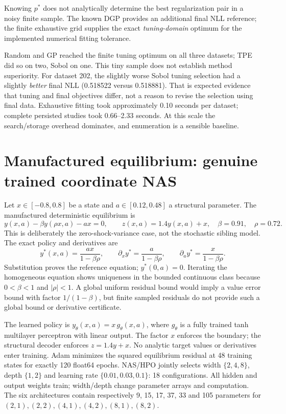 Knowing $p^*$ does not analytically determine the best regularization pair in
a noisy finite sample. The known DGP provides an additional final NLL reference;
the finite exhaustive grid supplies the exact \emph{tuning-domain} optimum for
the implemented numerical fitting tolerance.



Random and GP reached the finite tuning optimum on all three datasets; TPE did
so on two, Sobol on one. This tiny sample does not establish method superiority.
For dataset 202, the slightly worse Sobol tuning selection had a slightly
\emph{better} final NLL (0.518522 versus 0.518881). That is expected evidence
that tuning and final objectives differ, not a reason to revise the selection
using final data. Exhaustive fitting took approximately 0.10 seconds per
dataset; complete persisted studies took 0.66--2.33 seconds. At this scale the
search/storage overhead dominates, and enumeration is a sensible baseline.

\section{Manufactured equilibrium: genuine trained coordinate NAS}

Let $x\in[-0.8,0.8]$ be a state and $a\in[0.12,0.48]$ a structural
parameter. The manufactured deterministic equilibrium is
\[
 y(x,a)-\beta y(\rho x,a)-ax=0,\qquad
 z(x,a)=1.4y(x,a)+x,\quad \beta=0.91,\quad\rho=0.72.
\]
This is deliberately the zero-shock-variance case, not the stochastic sibling
model. The exact policy and derivatives are
\[
 y^*(x,a)=\frac{ax}{1-\beta\rho},\qquad
 \partial_x y^*=\frac{a}{1-\beta\rho},\qquad
 \partial_a y^*=\frac{x}{1-\beta\rho}.
\]
Substitution proves the reference equation; $y^*(0,a)=0$. Iterating the
homogeneous equation shows uniqueness in the bounded continuous class because
$0<\beta<1$ and $|\rho|<1$. A global uniform residual bound would imply a
value error bound with factor $1/(1-\beta)$, but finite sampled residuals do
not provide such a global bound or derivative certificate.

The learned policy is $y_\theta(x,a)=x\,g_\theta(x,a)$, where $g_\theta$ is
a fully trained tanh multilayer perceptron with linear output. The factor $x$
enforces the boundary; the structural decoder enforces $z=1.4y+x$. No analytic
target values or derivatives enter training. Adam minimizes the squared
equilibrium residual at 48 training states for exactly 120 float64 epochs.
NAS/HPO jointly selects width $\{2,4,8\}$, depth $\{1,2\}$ and learning rate
$\{0.01,0.03,0.1\}$: 18 configurations. All hidden and output weights train;
width/depth change parameter arrays and computation. The six architectures
contain respectively 9, 15, 17, 37, 33 and 105 parameters for
$(2,1),(2,2),(4,1),(4,2),(8,1),(8,2)$.

